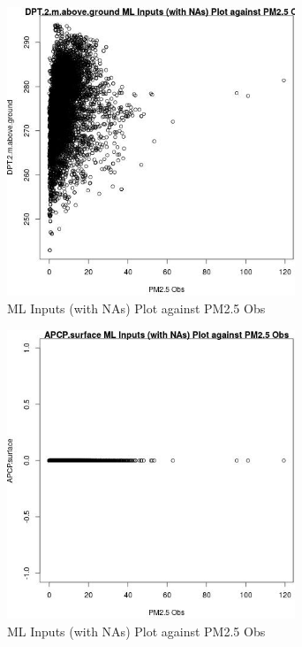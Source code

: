 \begin{figure} 
\centering  
\includegraphics[width=0.77\textwidth]{Code_Outputs/Report_ML_input_PM25_Step4_part_e_de_duplicated_aves_compiled_2019-05-18wNAs_DPT2mabovegroundvPM25_Obs.jpg} 
\caption{\label{fig:Report_ML_input_PM25_Step4_part_e_de_duplicated_aves_compiled_2019-05-18wNAsDPT2mabovegroundvPM25_Obs}ML Inputs (with NAs) Plot against PM2.5 Obs} 
\end{figure} 
 

\begin{figure} 
\centering  
\includegraphics[width=0.77\textwidth]{Code_Outputs/Report_ML_input_PM25_Step4_part_e_de_duplicated_aves_compiled_2019-05-18wNAs_APCPsurfacevPM25_Obs.jpg} 
\caption{\label{fig:Report_ML_input_PM25_Step4_part_e_de_duplicated_aves_compiled_2019-05-18wNAsAPCPsurfacevPM25_Obs}ML Inputs (with NAs) Plot against PM2.5 Obs} 
\end{figure} 
 

